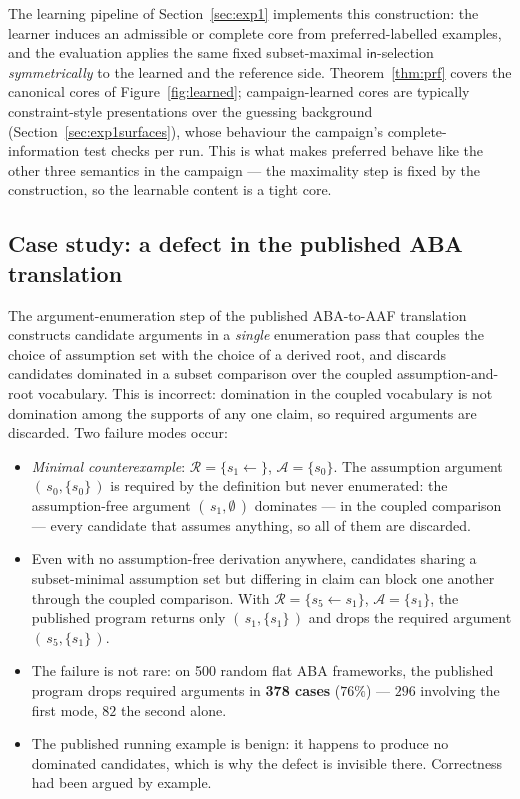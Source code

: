 \documentclass[review,12pt]{elsarticle}
\theoremstyle{definition}
\theoremstyle{remark}
\newcommand{\pred}[1]{\textsf{#1}}
\begin{document}
The learning pipeline of Section~\ref{sec:exp1} implements this
construction: the learner induces an admissible or complete core from
preferred-labelled examples, and the evaluation applies the same fixed
subset-maximal $\pred{in}$-selection \emph{symmetrically} to the learned and
the reference side. Theorem~\ref{thm:prf} covers the canonical cores of
Figure~\ref{fig:learned}; campaign-learned cores are typically
constraint-style presentations over the guessing background
(Section~\ref{sec:exp1surfaces}), whose behaviour the campaign's
complete-information test checks per run. This is what makes preferred behave
like the other three semantics in the campaign --- the maximality step is
fixed by the construction, so the learnable content is a tight core.

\subsection{Case study: a defect in the published ABA translation}
\label{sec:abadefect}

The argument-enumeration step of the published ABA-to-AAF translation
constructs candidate arguments in a \emph{single} enumeration pass that
couples the choice of assumption set with the choice of a derived root, and
discards candidates dominated in a subset comparison over the coupled
assumption-and-root vocabulary. This is incorrect: domination in the coupled
vocabulary is not domination among the supports of any one claim, so required
arguments are discarded. Two failure modes occur:

\begin{itemize}[leftmargin=1.6em,itemsep=2pt]
\item \emph{Minimal counterexample}: $\mathcal R=\{s_1\leftarrow\}$,
$\mathcal A=\{s_0\}$. The assumption argument $(\,s_0,\{s_0\}\,)$ is required
by the definition but never enumerated: the assumption-free argument
$(\,s_1,\emptyset\,)$ dominates --- in the coupled comparison --- every
candidate that assumes anything, so all of them are discarded.
\item Even with no assumption-free derivation anywhere, candidates sharing a
subset-minimal assumption set but differing in claim can block one another
through the coupled comparison. With $\mathcal R=\{s_5\leftarrow s_1\}$,
$\mathcal A=\{s_1\}$, the published program returns only $(\,s_1,\{s_1\}\,)$
and drops the required argument $(\,s_5,\{s_1\}\,)$.
\item The failure is not rare: on 500 random flat ABA frameworks, the
published program drops required arguments in \textbf{378 cases} ($76\%$) ---
$296$ involving the first mode, $82$ the second alone.
\item The published running example is benign: it happens to produce no
dominated candidates, which is why the defect is invisible there.
Correctness had been argued by example.
\end{itemize}
\end{document}
